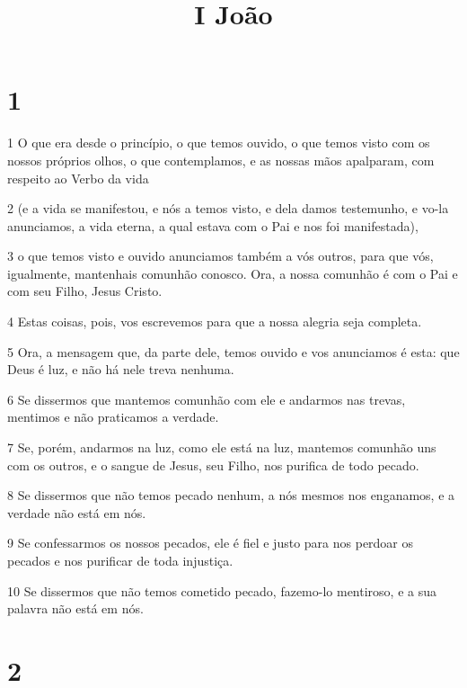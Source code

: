 

\title{I João}


\chapter{1}

\par 1 O que era desde o princípio, o que temos ouvido, o que temos visto com os nossos próprios olhos, o que contemplamos, e as nossas mãos apalparam, com respeito ao Verbo da vida
\par 2 (e a vida se manifestou, e nós a temos visto, e dela damos testemunho, e vo-la anunciamos, a vida eterna, a qual estava com o Pai e nos foi manifestada),
\par 3 o que temos visto e ouvido anunciamos também a vós outros, para que vós, igualmente, mantenhais comunhão conosco. Ora, a nossa comunhão é com o Pai e com seu Filho, Jesus Cristo.
\par 4 Estas coisas, pois, vos escrevemos para que a nossa alegria seja completa.
\par 5 Ora, a mensagem que, da parte dele, temos ouvido e vos anunciamos é esta: que Deus é luz, e não há nele treva nenhuma.
\par 6 Se dissermos que mantemos comunhão com ele e andarmos nas trevas, mentimos e não praticamos a verdade.
\par 7 Se, porém, andarmos na luz, como ele está na luz, mantemos comunhão uns com os outros, e o sangue de Jesus, seu Filho, nos purifica de todo pecado.
\par 8 Se dissermos que não temos pecado nenhum, a nós mesmos nos enganamos, e a verdade não está em nós.
\par 9 Se confessarmos os nossos pecados, ele é fiel e justo para nos perdoar os pecados e nos purificar de toda injustiça.
\par 10 Se dissermos que não temos cometido pecado, fazemo-lo mentiroso, e a sua palavra não está em nós.

\chapter{2}

